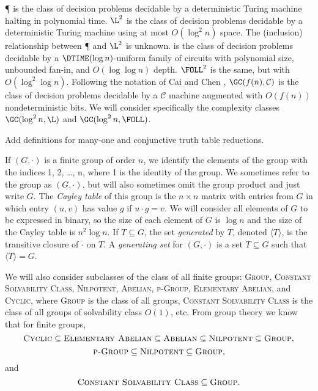 \documentclass{article}
\newcommand{\gen}[1]{{\langle #1 \rangle}}
\begin{document}
\P{} is the class of decision problems decidable by a deterministic Turing machine halting in polynomial time.
$\L^2$ is the class of decision problems decidable by a deterministic Turing machine using at most $O(\log^2 n)$ space.
The (inclusion) relationship between \P{} and $\L^2$ is unknown.
\FOLL{} is the class of decision problems decidable by a $\DTIME(\log n)$-uniform family of circuits with polynomial size, unbounded fan-in, and $O(\log \log n)$ depth.
$\FOLL^2$ is the same, but with $O(\log^2 \log n)$.
Following the notation of Cai and Chen \cite{cc97}, $\GC(f(n), \mathcal{C})$ is the class of decision problems decidable by a $\mathcal{C}$ machine augmented with $O(f(n))$ nondeterministic bits.
We will consider specifically the complexity classes $\GC(\log^2 n, \L)$ and $\GC(\log^2 n, \FOLL)$.
\begin{todo}
  Add definitions for many-one and conjunctive truth table reductions.
\end{todo}

If $(G, \cdot)$ is a finite group of order $n$, we identify the elements of the group with the indices 1, 2, \ldots, n, where 1 is the identity of the group.
We sometimes refer to the group as $(G, \cdot)$, but will also sometimes omit the group product and just write $G$.
The \emph{Cayley table} of this group is the $n \times n$ matrix with entries from $G$ in which entry $(u, v)$ has value $g$ if $u \cdot g = v$.
We will consider all elements of $G$ to be expressed in binary, so the size of each element of $G$ is $\log n$ and the size of the Cayley table is $n^2 \log n$.
If $T \subseteq G$, the set \emph{generated} by $T$, denoted $\gen{T}$, is the transitive closure of $\cdot$ on $T$.
A \emph{generating set} for $(G, \cdot)$ is a set $T \subseteq G$ such that $\gen{T} = G$.

We will also consider subclasses of the class of all finite groups: \textsc{Group}, \textsc{Constant Solvability Class}, \textsc{Nilpotent}, \textsc{Abelian}, \textsc{p-Group}, \textsc{Elementary Abelian}, and \textsc{Cyclic}, where \textsc{Group} is the class of all groups, \textsc{Constant Solvability Class} is the class of all groups of solvability class $O(1)$, etc.
From group theory we know that for finite groups,
\begin{equation*}
  \textsc{Cyclic} \subseteq \textsc{Elementary Abelian} \subseteq \textsc{Abelian} \subseteq \textsc{Nilpotent} \subseteq \textsc{Group},
\end{equation*}
\begin{equation*}
  \textsc{p-Group} \subseteq \textsc{Nilpotent} \subseteq \textsc{Group},
\end{equation*}
and
\begin{equation*}
  \textsc{Constant Solvability Class} \subseteq \textsc{Group}.
\end{equation*}
\end{document}
